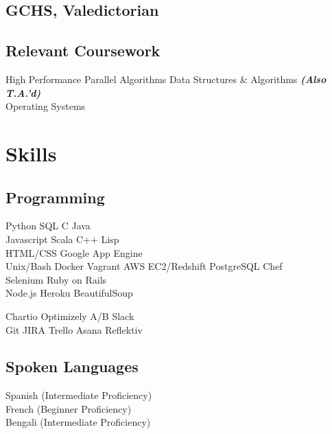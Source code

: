 \documentclass[]{deedy-resume-openfont}
\begin{document}
\begin{minipage}[t]{0.31\textwidth}
\subsection{GCHS, Valedictorian}
\sectionsep

\subsection{Relevant Coursework}
High Performance Parallel Algorithms
Data Structures \& Algorithms
{\footnotesize \textit{\textbf{(Also T.A.'d) }}} \\
Operating Systems
\\[1\baselineskip]


\section{Skills}
\subsection{Programming}

Python \textbullet{}  SQL  \textbullet{} C \textbullet{} Java 
\\[1\baselineskip]

Javascript \textbullet{} Scala \textbullet{}  C++  \textbullet{} Lisp
\\[1\baselineskip]

HTML/CSS \textbullet{} Google App Engine \\
\textbullet{}  Unix/Bash \textbullet{} Docker \textbullet{}  Vagrant \textbullet{} AWS EC2/Redshift \textbullet{} PostgreSQL \textbullet{}  Chef
\\[1\baselineskip]

Selenium \textbullet{} Ruby on Rails \\
\textbullet{}  Node.js \textbullet{}  Heroku \textbullet{}  BeautifulSoup
\sectionsep

Chartio \textbullet{}  Optimizely A/B \textbullet{}  Slack \\
\textbullet{}  Git \textbullet{}  JIRA \textbullet{} Trello \textbullet{} Asana \textbullet{} Reflektiv
\sectionsep

\subsection{Spoken Languages}
Spanish (Intermediate Proficiency) \\
French (Beginner Proficiency)\\
Bengali (Intermediate Proficiency)
\\[1\baselineskip]


\end{minipage}
\end{document}
